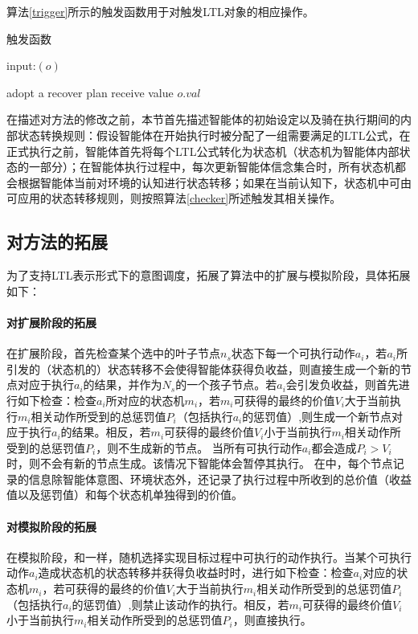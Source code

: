 算法\ref{trigger}所示的触发函数用于对触发LTL对象的相应操作。
\begin{algorithm} %
\caption{触发函数}\label{trigger}
\begin{algorithmic}[1]
\STATE input:$(o)$

\STATE adopt a recover plan
\ELSE
{}
\STATE receive value $o.val$
\ENDIF
\ENDIF

\end{algorithmic}
\end{algorithm}

在描述对\SA 方法的修改之前，本节首先描述智能体的初始设定以及骑在执行期间的内部状态转换规则：假设智能体在开始执行时被分配了一组需要满足的LTL公式，在正式执行之前，智能体首先将每个LTL公式转化为状态机（状态机为智能体内部状态的一部分）；在智能体执行过程中，每次更新智能体信念集合时，所有状态机都会根据智能体当前对环境的认知进行状态转移；如果在当前认知下，状态机中可由可应用的状态转移规则，则按照算法\ref{checker}所述触发其相关操作。

\subsection{对\SA 方法的拓展}
为了支持LTL表示形式下的意图调度，\SAT 拓展了\SA 算法中的扩展与模拟阶段，具体拓展如下：
\paragraph{对扩展阶段的拓展}
在扩展阶段，\SAT 首先检查某个选中的叶子节点$n_s$状态下每一个可执行动作$a_i$，若$a_i$所引发的（状态机的）状态转移不会使得智能体获得负收益，则直接生成一个新的节点对应于执行$a_i$的结果，并作为$N_s$的一个孩子节点。若$a_i$会引发负收益，则首先进行如下检查：检查$a_i$所对应的状态机$m_i$，若$m_i$可获得的最终的价值$V_i$大于当前执行$m_i$相关动作所受到的总惩罚值$P_i$（包括执行$a_i$的惩罚值）,则生成一个新节点对应于执行$a_i$的结果。相反，若$m_i$可获得的最终价值$V_i$小于当前执行$m_i$相关动作所受到的总惩罚值$P_i$，则不生成新的节点。
%
当所有可执行动作$a_i$都会造成$P_i > V_i$时，则不会有新的节点生成。该情况下智能体会暂停其执行。
%
在\SAT 中，每个节点记录的信息除智能体意图、环境状态外，还记录了执行过程中所收到的总价值（收益值以及惩罚值）和每个状态机单独得到的价值。

\paragraph{对模拟阶段的拓展}
在模拟阶段，\SAT 和\SA 一样，随机选择实现目标过程中可执行的动作执行。当某个可执行动作$a_i$造成状态机的状态转移并获得负收益时时，进行如下检查：检查$a_i$对应的状态机$m_i$，若可获得的最终的价值$V_i$大于当前执行$m_i$相关动作所受到的总惩罚值$P_i$（包括执行$a_i$的惩罚值）,则禁止该动作的执行。相反，若$m_i$可获得的最终价值$V_i$小于当前执行$m_i$相关动作所受到的总惩罚值$P_i$，则直接执行。

